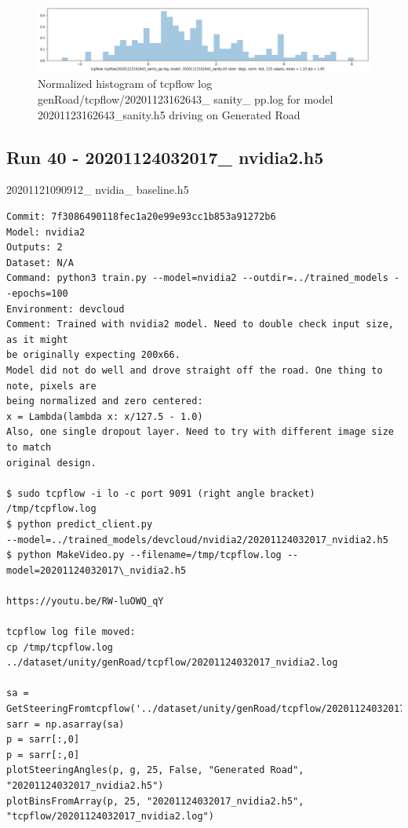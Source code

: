 \begin{figure}[ht]
 \centering 
 \includegraphics[width=\textwidth]{Figures/tcpflow_20201123162643_sanity_pp_bins.png}
 \caption{Normalized histogram of tcpflow log genRoad/tcpflow/20201123162643\_ sanity\_ pp.log for model 20201123162643\_sanity.h5 driving on Generated Road}
 \label{fig:tcpflow_20201123162643_pp_bins} 
\end{figure} 

\subsection{Run 40 - 20201124032017\_ nvidia2.h5}
\label{app_res:62}
20201121090912\_ nvidia\_ baseline.h5
\begin{verbatim}
Commit: 7f3086490118fec1a20e99e93cc1b853a91272b6
Model: nvidia2
Outputs: 2
Dataset: N/A
Command: python3 train.py --model=nvidia2 --outdir=../trained_models --epochs=100
Environment: devcloud
Comment: Trained with nvidia2 model. Need to double check input size, as it might
be originally expecting 200x66.
Model did not do well and drove straight off the road. One thing to note, pixels are
being normalized and zero centered:
x = Lambda(lambda x: x/127.5 - 1.0)
Also, one single dropout layer. Need to try with different image size to match
original design.

$ sudo tcpflow -i lo -c port 9091 (right angle bracket) /tmp/tcpflow.log
$ python predict_client.py
--model=../trained_models/devcloud/nvidia2/20201124032017_nvidia2.h5
$ python MakeVideo.py --filename=/tmp/tcpflow.log --model=20201124032017\_nvidia2.h5

https://youtu.be/RW-luOWQ_qY

tcpflow log file moved:
cp /tmp/tcpflow.log ../dataset/unity/genRoad/tcpflow/20201124032017_nvidia2.log

sa = GetSteeringFromtcpflow('../dataset/unity/genRoad/tcpflow/20201124032017_nvidia2.log)
sarr = np.asarray(sa)
p = sarr[:,0]
p = sarr[:,0]  
plotSteeringAngles(p, g, 25, False, "Generated Road", "20201124032017_nvidia2.h5")
plotBinsFromArray(p, 25, "20201124032017_nvidia2.h5", "tcpflow/20201124032017_nvidia2.log")
\end{verbatim}


